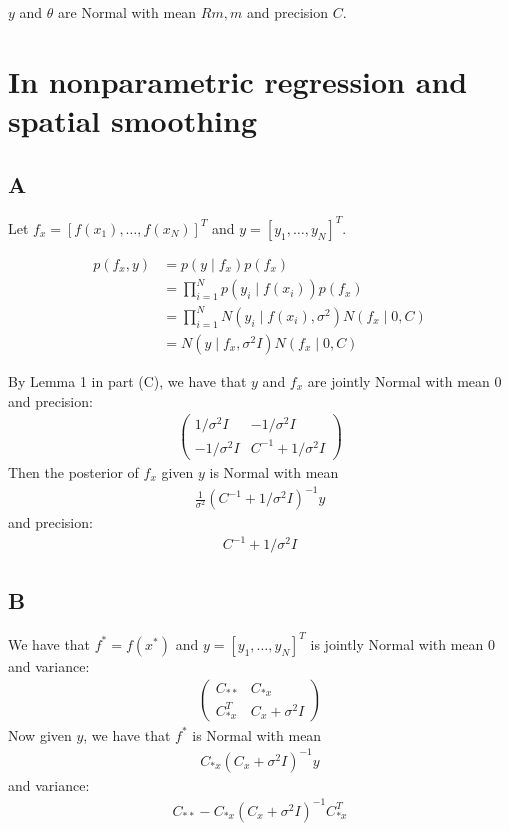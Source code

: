 \documentclass{article}
\begin{document}
\(y\) and \(\theta\) are Normal with mean \(Rm, m\) and precision \(C\).

\section*{In nonparametric regression and spatial smoothing}
\subsection*{A}
Let \(f_x = [ f(x_1), \ldots, f(x_N)]^T\) and \( y =  [ y_1, \ldots, y_N ]^T\).

\begin{align*}
p( f_x, y) &= p( y \mid f_x ) p( f_x ) \\
&= \prod_{i=1}^N p(y_i \mid f(x_i) ) p( f_x )\\
&= \prod_{i=1}^N N (y_i \mid f(x_i), \sigma^2) N( f_x \mid 0, C)\\
&= N( y \mid f_x, \sigma^2 I) N(f_x \mid 0, C)
\end{align*}

By Lemma 1 in part (C), we have that  \(y\) and \(f_x\)  are jointly Normal with mean \(0\) and precision:
\begin{align*}
\begin{pmatrix}
1/\sigma^2 I & -1/\sigma^2 I\\
-1/\sigma^2 I & C^{-1} + 1/\sigma^2 I
\end{pmatrix}
\end{align*}
Then the posterior of \(f_x\) given \(y\) is Normal with mean 
\begin{align*}
\frac{1}{\sigma^2} (C^{-1} + 1/\sigma^2 I)^{-1}  y
\end{align*}
and precision:
\begin{align*}
C^{-1} + 1/\sigma^2 I
\end{align*}

\subsection*{B}
We have that \(f^* = f(x^*)\) and \(y = [y_1, \ldots, y_N]^T\)  is jointly Normal with mean \(0\) and variance:
\begin{align*}
\begin{pmatrix}
C_{**} & C_{*x}\\
C_{*x}^T & C_x + \sigma^2 I
\end{pmatrix}
\end{align*}
Now given \(y\), we have that \(f^*\) is Normal with mean
\begin{align*}
C_{*x} (C_x + \sigma^2 I)^{-1} y
\end{align*}
and variance:
\begin{align*}
C_{**} - C_{*x} (C_x + \sigma^2 I)^{-1} C_{*x}^T
\end{align*}
\end{document}
